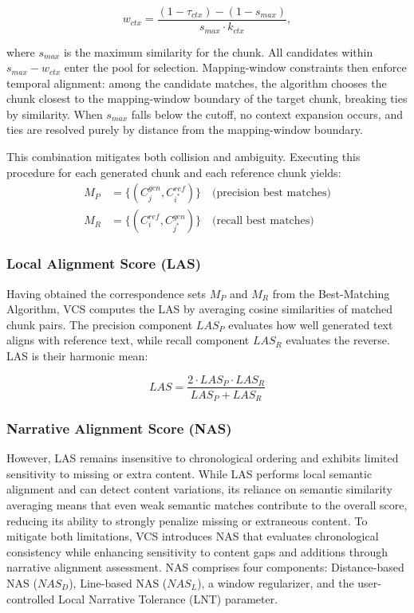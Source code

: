 \documentclass[main.tex]{subfiles}
\begin{document}
\begin{equation}
w_{ctx} = \frac{(1-\tau_{ctx})-(1-s_{max})}{s_{max} \cdot k_{ctx}},
\end{equation}

where $s_{max}$ is the maximum similarity for the chunk. All candidates within $s_{max} - w_{ctx}$ enter the pool for selection. Mapping-window constraints then enforce temporal alignment: among the candidate matches, the algorithm chooses the chunk closest to the mapping-window boundary of the target chunk, breaking ties by similarity. When $s_{max}$ falls below the cutoff, no context expansion occurs, and ties are resolved purely by distance from the mapping-window boundary.

This combination mitigates both collision and ambiguity. Executing this procedure for each generated chunk and each reference chunk yields:
\begin{align}
M_P &= \{(C_j^{gen}, C_{i^*}^{ref})\} \quad \text{(precision best matches)} \\
M_R &= \{(C_i^{ref}, C_{j^*}^{gen})\} \quad \text{(recall best matches)}
\end{align}

\subsubsection{Local Alignment Score (LAS)}
Having obtained the correspondence sets $M_P$ and $M_R$ from the Best-Matching Algorithm, VCS computes the LAS by averaging cosine similarities of matched chunk pairs. The precision component $LAS_P$ evaluates how well generated text aligns with reference text, while recall component $LAS_R$ evaluates the reverse. LAS is their harmonic mean:

\begin{equation}
LAS = \frac{2 \cdot LAS_P \cdot LAS_R}{LAS_P + LAS_R}
\end{equation}

\subsubsection{Narrative Alignment Score (NAS)}
However, LAS remains insensitive to chronological ordering and exhibits limited sensitivity to missing or extra content. While LAS performs local semantic alignment and can detect content variations, its reliance on semantic similarity averaging means that even weak semantic matches contribute to the overall score, reducing its ability to strongly penalize missing or extraneous content. To mitigate both limitations, VCS introduces NAS that evaluates chronological consistency while enhancing sensitivity to content gaps and additions through narrative alignment assessment. NAS comprises four components: Distance-based NAS ($NAS_D$), Line-based NAS ($NAS_L$), a window regularizer, and the user-controlled Local Narrative Tolerance (LNT) parameter.
\end{document}
